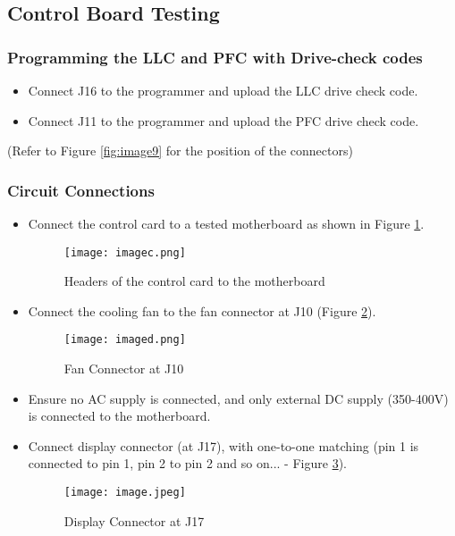 \subsection{Control Board Testing}

\subsubsection{Programming the LLC and PFC with Drive-check codes}
\begin{itemize}
    \item Connect J16 to the programmer and upload the LLC drive check code.
    \item Connect J11 to the programmer and upload the PFC drive check code.
\end{itemize}
(Refer to Figure \ref*{fig:image9} for the position of the connectors)

\subsubsection{Circuit Connections}
\begin{itemize}
    \item Connect the control card to a tested motherboard as shown in Figure \ref*{fig:imagec}.
    \begin{figure}[H]
        \centering
        \texttt{[image: imagec.png]}
        \caption{Headers of the control card to the motherboard}
        \label{fig:imagec}
    \end{figure}
    
    \item Connect the cooling fan to the fan connector at J10 (Figure \ref{fig:imaged}).
    \begin{figure}[H]
        \centering
        \texttt{[image: imaged.png]}
        \caption{Fan Connector at J10}
        \label{fig:imaged}
    \end{figure}
    
    \item Ensure no AC supply is connected, and only external DC supply (350-400V) is connected to the motherboard.
    \item Connect display connector (at J17), with one-to-one matching (pin 1 is connected to pin 1, pin 2 to pin 2 and so on... - Figure \ref*{fig:image_fan}).
    \begin{figure}[H]
        \centering
        \texttt{[image: image.jpeg]}
        \caption{Display Connector at J17}
        \label{fig:image_fan}
    \end{figure}
\end{itemize}


